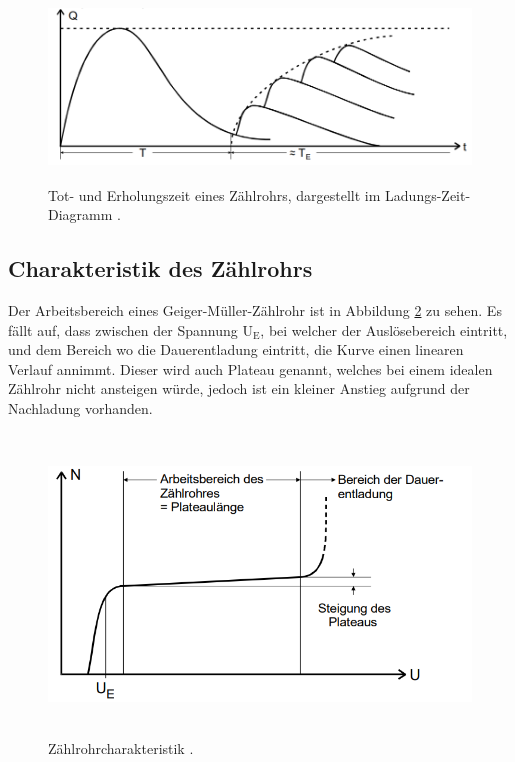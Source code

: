 \begin{figure}[H]
    \centering
    \includegraphics[height=50mm]{bilder/Ab3.png}
    \caption{Tot- und Erholungszeit eines Zählrohrs, dargestellt im Ladungs-Zeit-Diagramm \cite{a1}. \label{Abbildung3} }
\end{figure}

\subsection{Charakteristik des Zählrohrs}

\begin{flushleft}
    Der Arbeitsbereich eines Geiger-Müller-Zählrohr ist in Abbildung \ref{Abbildung4} zu sehen.
    Es fällt auf, dass zwischen der Spannung $\text{U}_{\text{E}}$, bei welcher der Auslösebereich eintritt, und dem Bereich wo die Dauerentladung eintritt, die Kurve einen linearen Verlauf annimmt.
    Dieser wird auch Plateau genannt, welches bei einem idealen Zählrohr nicht ansteigen würde, jedoch ist ein kleiner Anstieg aufgrund der Nachladung vorhanden.
\end{flushleft}

\begin{figure}[H]
    \centering
    \includegraphics[height=80mm]{bilder/Ab4.png}
    \caption{Zählrohrcharakteristik \cite{a1}. \label{Abbildung4} }
\end{figure}

